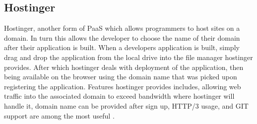 \subsection{Hostinger}
Hostinger, another form of PaaS which allows programmers to host sites on a domain. In turn this allows the developer to choose the name of their domain after their application is built. When a developers application is built, simply drag and drop the application from the local drive into the file manager hostinger provides. After which hostinger deals with deployment of the application, then being available on the browser using the domain name that was picked upon registering the application. Features hostinger provides includes, allowing web traffic into the associated domain to exceed bandwidth where hostinger will handle it, domain name can be provided after sign up, HTTP/3 usage, and GIT support are among the most useful \cite{Hostingerfeatures}.